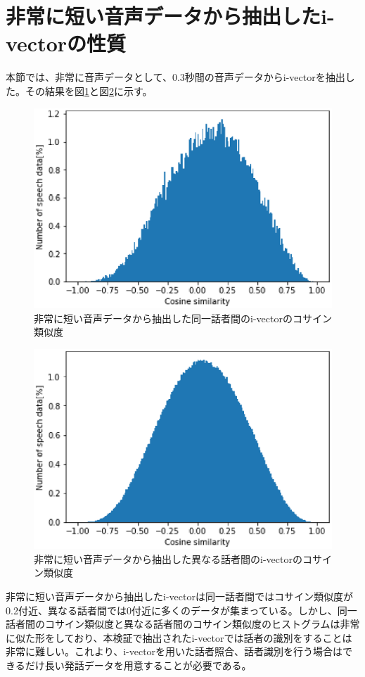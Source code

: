 \section{非常に短い音声データから抽出したi-vectorの性質}
本節では、非常に音声データとして、0.3秒間の音声データからi-vectorを抽出した。その結果を図\ref{fig:iv_same_short}と図\ref{fig:iv_other_short}に示す。\par

\begin{figure}[htb]
  \begin{center}
    \includegraphics{../../image/same_sp_short_0_3.eps}
  \end{center}
  \caption{非常に短い音声データから抽出した同一話者間のi-vectorのコサイン類似度 \label{fig:iv_same_short}}
\end{figure}

\begin{figure}[htb]
  \begin{center}
    \includegraphics{../../image/other_sp_short_0_3.eps}
  \end{center}
  \caption{非常に短い音声データから抽出した異なる話者間のi-vectorのコサイン類似度 \label{fig:iv_other_short}} 
\end{figure}

非常に短い音声データから抽出したi-vectorは同一話者間ではコサイン類似度が0.2付近、異なる話者間では0付近に多くのデータが集まっている。しかし、同一話者間のコサイン類似度と異なる話者間のコサイン類似度のヒストグラムは非常に似た形をしており、本検証で抽出されたi-vectorでは話者の識別をすることは非常に難しい。これより、i-vectorを用いた話者照合、話者識別を行う場合はできるだけ長い発話データを用意することが必要である。

